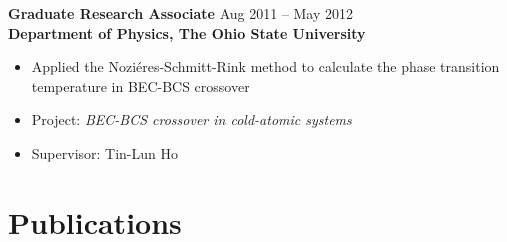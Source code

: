 \documentclass[11pt]{../yhlcv}
\begin{document}
{\bf Graduate Research Associate} \hfill Aug 2011 -- May 2012 \vspace{0.25em} \\
{\bf Department of Physics, The Ohio State University}
\vspace{-0.7em}\\
\begin{itemize}[leftmargin=*]\itemsep-0.2em
\item Applied the Nozi\'{e}res-Schmitt-Rink method to calculate the phase transition temperature in
	BEC-BCS crossover
\item[] Project: {\it BEC-BCS crossover in cold-atomic systems}
\item[] Supervisor: Tin-Lun Ho
\end{itemize}

\section*{Publications}
\end{document}
